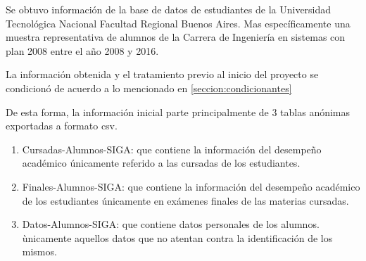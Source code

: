Se obtuvo información de la base  de datos de estudiantes de la Universidad Tecnológica Nacional Facultad Regional Buenos Aires. Mas específicamente una muestra representativa de alumnos de la Carrera de Ingeniería en sistemas con plan 2008 entre el año 2008 y 2016.

La información obtenida y el tratamiento previo al inicio del proyecto se condicionó de acuerdo a lo mencionado en \ref{seccion:condicionantes}

\label{datos:raw}
De esta forma, la información inicial parte principalmente de 3 tablas anónimas exportadas a formato csv.

\begin{enumerate}
\item Cursadas-Alumnos-SIGA: que contiene la información del desempeño académico únicamente referido a las cursadas de los estudiantes.
\item Finales-Alumnos-SIGA: que contiene la información del desempeño académico de los estudiantes únicamente en exámenes finales de las materias cursadas.
\item Datos-Alumnos-SIGA: que contiene datos personales de los alumnos. ùnicamente aquellos datos que no atentan contra la identificación de los mismos.
\end{enumerate}


